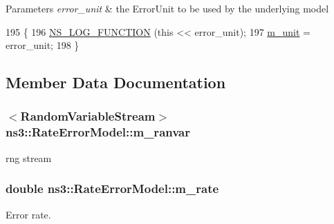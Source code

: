 \begin{DoxyParams}{Parameters}
{\em error\+\_\+unit} & the Error\+Unit to be used by the underlying model \\
\hline
\end{DoxyParams}

\begin{DoxyCode}
195 \{ 
196   \hyperlink{log-macros-disabled_8h_a90b90d5bad1f39cb1b64923ea94c0761}{NS\_LOG\_FUNCTION} (\textcolor{keyword}{this} << error\_unit);
197   \hyperlink{classns3_1_1RateErrorModel_a75b25e124364618bf15d66d0634c9cd4}{m\_unit} = error\_unit; 
198 \}
\end{DoxyCode}


\subsection{Member Data Documentation}
\subsubsection[{\texorpdfstring{m\+\_\+ranvar}{m_ranvar}}]{$<${\bf Random\+Variable\+Stream}$>$ ns3\+::\+Rate\+Error\+Model\+::m\+\_\+ranvar\hspace{0.3cm}{\ttfamily [private]}}\hypertarget{classns3_1_1RateErrorModel_ab1b5b03b825edbd1d566213501aacca6}{}\label{classns3_1_1RateErrorModel_ab1b5b03b825edbd1d566213501aacca6}


rng stream 

\subsubsection[{\texorpdfstring{m\+\_\+rate}{m_rate}}]{\setlength{\rightskip}{0pt plus 5cm}double ns3\+::\+Rate\+Error\+Model\+::m\+\_\+rate\hspace{0.3cm}{\ttfamily [private]}}\hypertarget{classns3_1_1RateErrorModel_a024517a97a3487e851dbdfffb291cbd2}{}\label{classns3_1_1RateErrorModel_a024517a97a3487e851dbdfffb291cbd2}


Error rate. 

